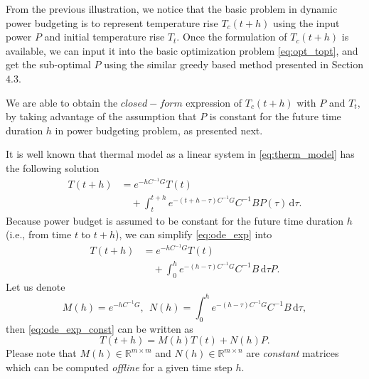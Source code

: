 From the previous illustration, we notice that the basic problem in dynamic power budgeting is to represent temperature rise $T_{c}(t+h)$ using the input power $P$ and initial temperature rise $T_{t}$. Once the formulation of $T_{c}(t+h)$ is available, we can input it into the basic optimization problem \eqref{eq:opt_topt}, and get the sub-optimal $P$ using the similar greedy based method presented in Section $4.3$.

We are able to obtain the $closed-form$ expression of $T_{c}(t+h)$ with $P$ and $T_{t}$, by taking advantage of the assumption that $P$ is constant for the future time duration $h$ in power budgeting problem, as presented next.

It is well known that thermal model as a linear system in \eqref{eq:therm_model} has the following solution
\begin{equation}\label{eq:ode_exp}
\begin{split}
T(t+h) &= e^{-hC^{-1}G}T(t)\\
& \quad +\int_{t}^{t+h} \! e^{-(t+h-\tau)C^{-1}G}C^{-1}BP(\tau) \, \mathrm{d}\tau.
\end{split}
\end{equation}
Because power budget is assumed to be constant for the future time
duration $h$ (i.e., from time $t$ to $t+h$), we can simplify
\eqref{eq:ode_exp} into
\begin{equation}\label{eq:ode_exp_const}
\begin{split}
T(t+h) &= e^{-hC^{-1}G}T(t)\\
& \quad +\int_{0}^{h} \! e^{-(h-\tau)C^{-1}G}C^{-1}B \, \mathrm{d}\tau P.
\end{split}
\end{equation}
Let us denote 
\begin{equation*}
M(h)=e^{-hC^{-1}G}, ~~N(h)=\int_{0}^{h} \! e^{-(h-\tau)C^{-1}G}C^{-1}B \, \mathrm{d}\tau,
\end{equation*}
then \eqref{eq:ode_exp_const} can be written as
\begin{equation}\label{eq:ode_exp_h}
T(t+h) =M(h)T(t)+N(h)P.
\end{equation}
Please note that $M(h) \in \mathbb{R}^{m\times m}$ and $N(h) \in
\mathbb{R}^{m \times n}$ are \emph{constant} matrices which
can be computed \emph{offline} for a given time step $h$. 

